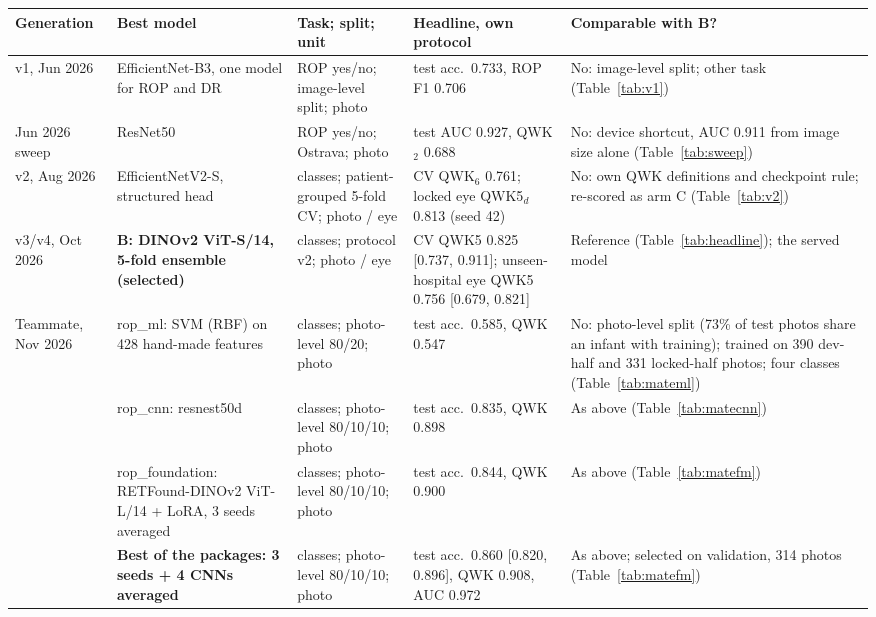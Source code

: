 \begin{tabular}{@{}>{\raggedright\arraybackslash}p{1.55cm}>{\raggedright\arraybackslash}p{4.1cm}>{\raggedright\arraybackslash}p{3.0cm}>{\raggedright\arraybackslash}p{3.55cm}>{\raggedright\arraybackslash}p{4.9cm}@{}}
\toprule
Generation & Best model & Task; split; unit & Headline, own protocol & Comparable with B?\\
\midrule
v1, Jun 2026 & EfficientNet-B3, one model for ROP and DR & ROP yes/no; image-level split; photo & test acc.\ 0.733, ROP F1 0.706 & No: image-level split; other task (Table~\ref{tab:v1}) \\
Jun 2026 sweep & ResNet50 & ROP yes/no; Ostrava; photo & test AUC 0.927, QWK$_2$ 0.688 & No: device shortcut, AUC 0.911 from image size alone (Table~\ref{tab:sweep}) \\
v2, Aug 2026 & EfficientNetV2-S, structured head & 6 classes; patient-grouped 5-fold CV; photo / eye & CV QWK$_6$ 0.761; locked eye QWK5$_d$ 0.813 (seed 42) & No: own QWK definitions and checkpoint rule; re-scored as arm C (Table~\ref{tab:v2}) \\
v3/v4, Oct 2026 & \textbf{B: DINOv2 ViT-S/14, 5-fold ensemble (selected)} & 6 classes; protocol v2; photo / eye & CV QWK5 0.825 [0.737, 0.911]; unseen-hospital eye QWK5 0.756 [0.679, 0.821] & Reference (Table~\ref{tab:headline}); the served model \\
Teammate, Nov 2026 & rop\_ml: SVM (RBF) on 428 hand-made features & 4 classes; photo-level 80/20; photo & test acc.\ 0.585, QWK 0.547 & No: photo-level split (73\% of test photos share an infant with training); trained on 390 dev-half and 331 locked-half photos; four classes (Table~\ref{tab:mateml}) \\
 & rop\_cnn: resnest50d & 4 classes; photo-level 80/10/10; photo & test acc.\ 0.835, QWK 0.898 & As above (Table~\ref{tab:matecnn}) \\
 & rop\_foundation: RETFound-DINOv2 ViT-L/14 + LoRA, 3 seeds averaged & 4 classes; photo-level 80/10/10; photo & test acc.\ 0.844, QWK 0.900 & As above (Table~\ref{tab:matefm}) \\
 & \textbf{Best of the packages: 3 seeds + 4 CNNs averaged} & 4 classes; photo-level 80/10/10; photo & test acc.\ 0.860 [0.820, 0.896], QWK 0.908, AUC 0.972 & As above; selected on validation, 314 photos (Table~\ref{tab:matefm}) \\
\bottomrule
\end{tabular}
